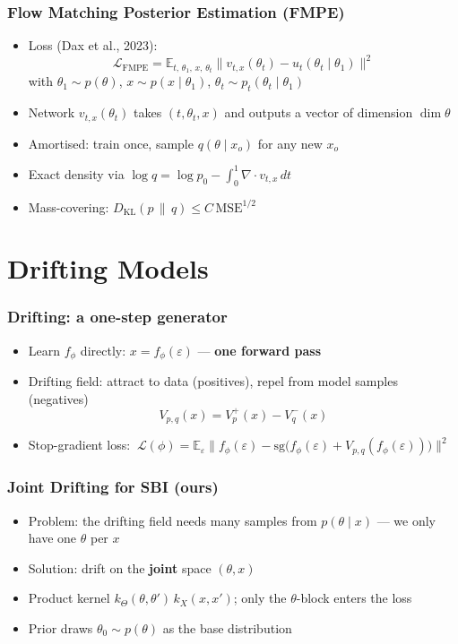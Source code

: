 \documentclass[handout]{beamer}
\begin{document}
\begin{frame}
	\frametitle{Flow Matching Posterior Estimation (FMPE)}
	\begin{itemize}
		\item Loss (Dax et al., 2023):
		\[
			\mathcal{L}_{\text{FMPE}} = \mathbb{E}_{t,\, \theta_1,\, x,\, \theta_t}
			\bigl\| v_{t,x}(\theta_t) - u_t(\theta_t \mid \theta_1) \bigr\|^2
		\]
		with $\theta_1 \sim p(\theta)$, $x \sim p(x \mid \theta_1)$, $\theta_t \sim p_t(\theta_t \mid \theta_1)$
		\item Network $v_{t,x}(\theta_t)$ takes $(t, \theta_t, x)$ and outputs a vector of dimension $\dim\theta$
		\item Amortised: train once, sample $q(\theta \mid x_o)$ for any new $x_o$
		\item Exact density via $\log q = \log p_0 - \int_0^1 \nabla \cdot v_{t,x}\, dt$
		\item Mass-covering: $D_{\text{KL}}(p \,\|\, q) \le C\, \text{MSE}^{1/2}$
	\end{itemize}
\end{frame}


\section{Drifting Models}

\begin{frame}
	\frametitle{Drifting: a one-step generator}
	\begin{itemize}
		\item Learn $f_\phi$ directly: $x = f_\phi(\varepsilon)$ --- \textbf{one forward pass}
		\item Drifting field: attract to data (positives), repel from model samples (negatives)
		\[
			V_{p,q}(x) = V^{+}_{p}(x) - V^{-}_{q}(x)
		\]
		\item Stop-gradient loss: $\ \mathcal{L}(\phi) = \mathbb{E}_\varepsilon \bigl\| f_\phi(\varepsilon) - \mathrm{sg}\bigl(f_\phi(\varepsilon) + V_{p,q}(f_\phi(\varepsilon))\bigr) \bigr\|^2$
	\end{itemize}
\end{frame}

\begin{frame}
	\frametitle{Joint Drifting for SBI (ours)}
	\begin{itemize}
		\item Problem: the drifting field needs many samples from $p(\theta \mid x)$ --- we only have one $\theta$ per $x$
		\item Solution: drift on the \textbf{joint} space $(\theta, x)$
		\item Product kernel $k_\Theta(\theta, \theta')\, k_X(x, x')$; only the $\theta$-block enters the loss
		\item Prior draws $\theta_0 \sim p(\theta)$ as the base distribution
	\end{itemize}
\end{frame}
\end{document}
